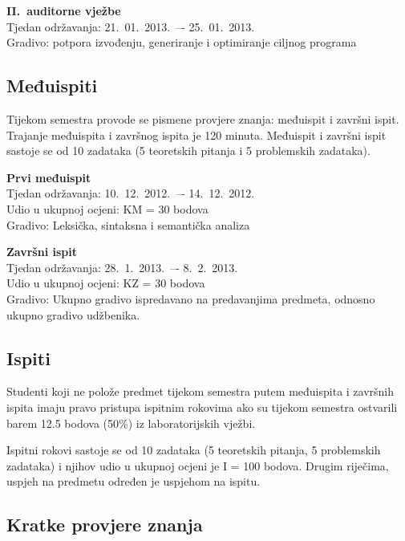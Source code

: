 \documentclass[times, 12pt, utf8]{book}
\begin{document}
\textbf{II.~auditorne vježbe} \\
Tjedan održavanja: 21.~01.~2013.~–- 25.~01.~2013. \\
Gradivo: potpora izvođenju, generiranje i optimiranje ciljnog programa


\cleardoublepage  
{}  
{}
\subsection*{Međuispiti}

Tijekom semestra provode se pismene provjere znanja: međuispit i završni ispit.
Trajanje međuispita i završnog ispita je 120 minuta.
Međuispit i završni ispit sastoje se od 10 zadataka (5 teoretskih pitanja i 5 problemskih zadataka).

\textbf{Prvi međuispit} \\
Tjedan održavanja: 10.~12.~2012.~–- 14.~12.~2012. \\
Udio u ukupnoj ocjeni:  KM = 30 bodova \\
Gradivo: Leksička, sintaksna i semantička analiza

\textbf{Završni ispit} \\
Tjedan održavanja: 28.~1.~2013.~–- 8.~2.~2013. \\
Udio u ukupnoj ocjeni: KZ = 30 bodova \\
Gradivo: Ukupno gradivo ispredavano na predavanjima predmeta, odnosno ukupno gradivo udžbenika.

\cleardoublepage  
{}  
{}
\subsection*{Ispiti}

Studenti koji ne polože predmet tijekom semestra putem međuispita i završnih ispita imaju pravo pristupa ispitnim rokovima ako su tijekom semestra ostvarili barem 12.5 bodova (50\%) iz laboratorijskih vježbi.

Ispitni rokovi sastoje se od 10 zadataka (5 teoretskih pitanja, 5 problemskih zadataka) i njihov udio u ukupnoj ocjeni je I = 100 bodova.
Drugim riječima, uspjeh na predmetu određen je uspjehom na ispitu.

\cleardoublepage  
{}  
{}
\subsection*{Kratke provjere znanja}
\end{document}
